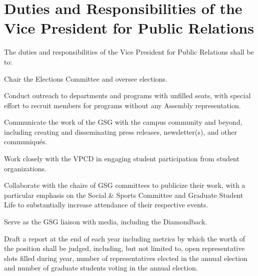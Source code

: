 \section{Duties and Responsibilities of the Vice President for Public Relations}
The duties and responsibilities of the Vice President for Public Relations shall be to:
\begin{bylaws-number}
  \item Chair the Elections Committee and oversee elections.
  \item Conduct outreach to departments and programs with unfilled seats, with special effort to recruit members for programs without any Assembly representation.
  \item Communicate the work of the GSG with the campus community and beyond, including creating and disseminating press releases, newsletter(s), and other communiqués.
  \item Work closely with the VPCD in engaging student participation from student organizations.
  \item Collaborate with the chairs of GSG committees to publicize their work, with a particular emphasis on the Social \& Sports Committee and Graduate Student Life to substantially increase attendance of their respective events.
  \item Serve as the GSG liaison with media, including the Diamondback.
  \item Draft a report at the end of each year including metrics by which the worth of the position shall be judged, including, but not limited to, open representative slots filled during year, number of representatives elected in the annual election and number of graduate students voting in the annual election.
\end{bylaws-number}

